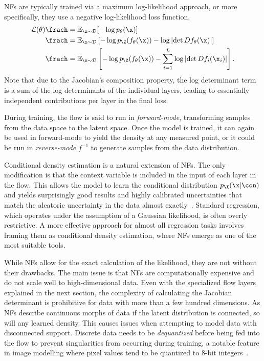 NFs are typically trained via a maximum log-likelihood approach, or more specifically, they use a negative log-likelihood loss function,
\begin{equation}
    \label{eq:nf_loss}
    \begin{aligned}
        \mathcal{L}(\theta)
        \frach & = \mathbb{E}_{\x \sim \mathcal{D}}[-\log p_{\theta}(\x)]                                                                        \\
        \frach & = \mathbb{E}_{\x \sim \mathcal{D}}\left[-\log p_{\Z}(f_{\theta}(\x)) - \log \left|\det D f_{\theta}(\x) \right|\right]          \\
        \frach & = \mathbb{E}_{\x \sim \mathcal{D}}\left[-\log p_{\Z}(f_{\theta}(\x)) - \sum_{i=1}^L \log \left|\det D f_i(\x_i) \right|\right].
    \end{aligned}
\end{equation}
Note that due to the Jacobian's composition property, the log determinant term is a sum of the log determinants of the individual layers, leading to essentially independent contributions per layer in the final loss.

During training, the flow is said to run in \textit{forward-mode}, transforming samples from the data space to the latent space.
Once the model is trained, it can again be used in forward-mode to yield the density at any measured point, or it could be run in \textit{reverse-mode} $f^{-1}$ to generate samples from the data distribution.

Conditional density estimation is a natural extension of NFs.
The only modification is that the context variable is included in the input of each layer in the flow.
This allows the model to learn the conditional distribution $p_{\X}(\x|\con)$ and yields surprisingly good results and highly calibrated uncertainties that match the aleatoric uncertainty in the data almost exactly~\cite{SolvingInverseProblems, InferenceAstrophysicalParameters, ComposingNormalizingFlows, NormalizingFlowsProbabilistic}.
Standard regression, which operates under the assumption of a Gaussian likelihood, is often overly restrictive.
A more effective approach for almost all regression tasks involves framing them as conditional density estimation, where NFs emerge as one of the most suitable tools.

While NFs allow for the exact calculation of the likelihood, they are not without their drawbacks.
The main issue is that NFs are computationally expensive and do not scale well to high-dimensional data.
Even with the specialized flow layers explained in the next section, the complexity of calculating the Jacobian determinant is prohibitive for data with more than a few hundred dimensions.
As NFs describe continuous morphs of data if the latent distribution is connected, so will any learned density.
This causes issues when attempting to model data with disconnected support.
Discrete data needs to be \textit{dequantized} before being fed into the flow to prevent singularities from occurring during training, a notable feature in image modelling where pixel values tend to be quantized to 8-bit integers~\cite{FlowImprovingFlowBased}.

